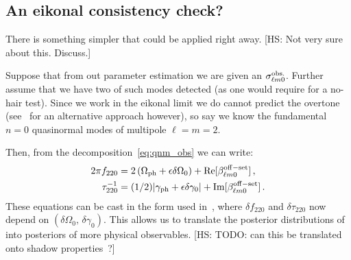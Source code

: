 \documentclass[aps,10pt,preprint,
               notitlepage,onecolumn,superscriptaddress,
               eqsecnum,
               nofootinbib,tightenlines,floatfix]{revtex4-1}
\newcommand{\hs}[1]{{\color{magenta}[HS: #1]}}
\begin{document}
\subsection{An eikonal consistency check?}

There is something simpler that could be applied right away.
\hs{Not very sure about this. Discuss.}

Suppose that from out parameter estimation we are given an
%
$\sigma_{\ell m 0}^{\rm obs.}$.
%
Further assume that we have two of such modes detected (as one would require
for a no-hair test). Since we work in the eikonal limit we do cannot predict the
overtone (see~\cite{Dolan:2009nk} for an alternative approach however), so say we know the fundamental $n=0$
quasinormal modes of multipole $\ell = m = 2$.

Then, from the decomposition~\eqref{eq:qnm_obs} we can write:
%
\begin{subequations}
\begin{align}
    2 \pi f_{220} &= 2 \left( \Omega_{\rm ph} + \epsilon \delta \Omega_{0} \right) + {\rm  Re}[\beta^{\rm off-set}_{\ell m 0}]\,,
    \\
    \tau^{-1}_{220} &= (1/2) |\gamma_{\rm ph} + \epsilon \delta \gamma_{0}| + {\rm  Im}[\beta^{\rm off-set}_{\ell m 0}]\,.
\end{align}
\end{subequations}
%
These equations can be cast in the form used in~\cite{Ghosh:2021mrv}, where $\delta f_{220}$
and $\delta \tau_{220}$ now depend on $(\delta \Omega_0,\, \delta \gamma_0)$.
%
This allows us to translate the posterior distributions of~\cite{Ghosh:2021mrv} into posteriors of more
physical observables.
%
\hs{TODO: can this be translated onto shadow properties~\cite{Yang:2021zqy}?}
\end{document}
